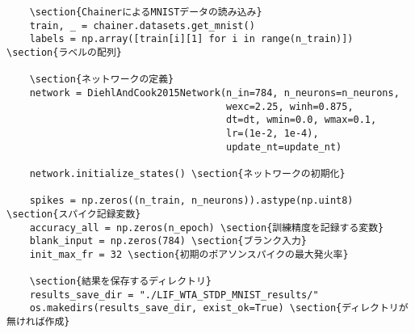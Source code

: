 \begin{verbatim}
    \section{ChainerによるMNISTデータの読み込み}
    train, _ = chainer.datasets.get_mnist()
    labels = np.array([train[i][1] for i in range(n_train)]) \section{ラベルの配列}
    
    \section{ネットワークの定義}
    network = DiehlAndCook2015Network(n_in=784, n_neurons=n_neurons,
                                      wexc=2.25, winh=0.875,
                                      dt=dt, wmin=0.0, wmax=0.1,
                                      lr=(1e-2, 1e-4),
                                      update_nt=update_nt)
    
    network.initialize_states() \section{ネットワークの初期化}

    spikes = np.zeros((n_train, n_neurons)).astype(np.uint8) \section{スパイク記録変数}
    accuracy_all = np.zeros(n_epoch) \section{訓練精度を記録する変数}
    blank_input = np.zeros(784) \section{ブランク入力}
    init_max_fr = 32 \section{初期のポアソンスパイクの最大発火率}
    
    \section{結果を保存するディレクトリ}
    results_save_dir = "./LIF_WTA_STDP_MNIST_results/"
    os.makedirs(results_save_dir, exist_ok=True) \section{ディレクトリが無ければ作成}
    

\end{verbatim}
